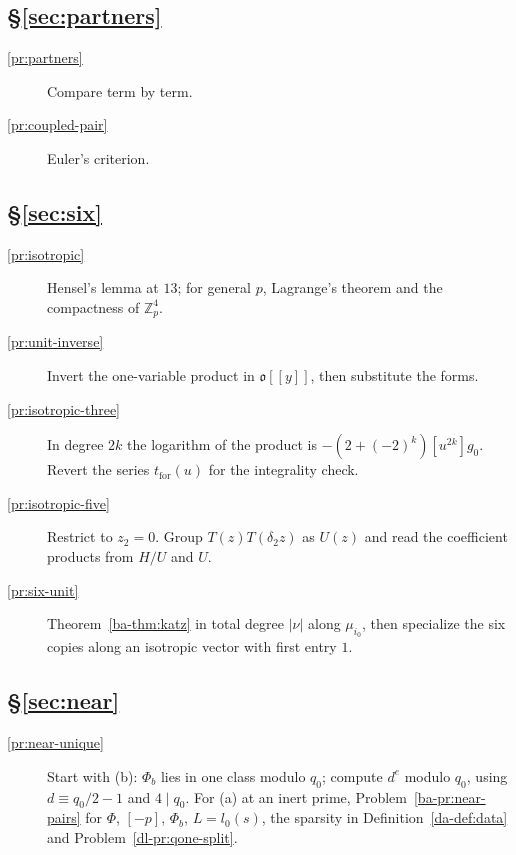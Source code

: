 \documentclass[reqno]{amsart}
\theoremstyle{definition}
\theoremstyle{plain}
\newcommand{\Z}{\mathbb{Z}}
\newcommand{\oo}{\mathfrak o}
\begin{document}
\subsection*{\S\ref{sec:partners}}
\begin{description}
\item[\ref{pr:partners}] Compare term by term.
\item[\ref{pr:coupled-pair}] Euler's criterion.
\end{description}

\subsection*{\S\ref{sec:six}}
\begin{description}
\item[\ref{pr:isotropic}] Hensel's lemma at \(13\); for general \(p\), Lagrange's theorem and the compactness of \(\Z_p^4\).
\item[\ref{pr:unit-inverse}] Invert the one-variable product in \(\oo[[y]]\), then substitute the forms.
\item[\ref{pr:isotropic-three}] In degree \(2k\) the logarithm of the product is \(-(2+(-2)^k)[u^{2k}]g_0\).  Revert the series \(t_{\mathrm{for}}(u)\) for the integrality check.
\item[\ref{pr:isotropic-five}] Restrict to \(z_2=0\).  Group \(T(z)T(\delta_2 z)\) as \(U(z)\) and read the coefficient products from \(H/U\) and \(U\).
\item[\ref{pr:six-unit}] Theorem~\ref{ba-thm:katz} in total degree \(\lvert\nu\rvert\) along \(\mu_{i_0}\), then specialize the six copies along an isotropic vector with first entry \(1\).
\end{description}

\subsection*{\S\ref{sec:near}}
\begin{description}
\item[\ref{pr:near-unique}] Start with (b): \(\Phi_b\) lies in one class modulo \(q_0\); compute \(d^e\) modulo \(q_0\), using \(d \equiv q_0/2 - 1\) and \(4 \mid q_0\).  For (a) at an inert prime, Problem~\ref{ba-pr:near-pairs} for \(\Phi\), \([-p]\), \(\Phi_b\), \(L = l_0(s)\), the sparsity in Definition~\ref{da-def:data} and Problem~\ref{dl-pr:qone-split}.
\end{description}
\end{document}
